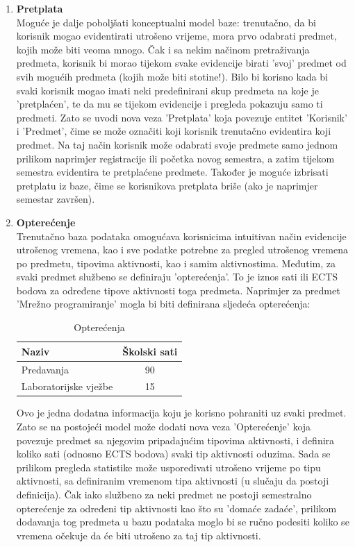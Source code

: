 \documentclass[times, utf8, zavrsni, numeric]{fer}
\begin{document}
\begin{enumerate}[leftmargin=*]
\item \textbf{Pretplata}\\
Moguće je dalje poboljšati konceptualni model baze: trenutačno, da bi korisnik mogao evidentirati utrošeno vrijeme, mora prvo odabrati predmet, kojih može biti veoma mnogo. Čak i sa nekim načinom pretraživanja predmeta, korisnik bi morao tijekom svake evidencije birati 'svoj' predmet od svih mogućih predmeta (kojih može biti stotine!). Bilo bi korisno kada bi svaki korisnik mogao imati neki predefinirani skup predmeta na koje je 'pretplaćen', te da mu se tijekom evidencije i pregleda pokazuju samo ti predmeti. Zato se uvodi nova veza 'Pretplata' koja povezuje entitet 'Korisnik' i 'Predmet', čime se može označiti koji korisnik trenutačno evidentira koji predmet. Na taj način korisnik može odabrati svoje predmete samo jednom prilikom naprimjer registracije ili početka novog semestra, a zatim tijekom semestra evidentira te pretplaćene predmete. Također je moguće izbrisati pretplatu iz baze, čime se korisnikova pretplata briše (ako je naprimjer semestar završen).

\item \textbf{Opterećenje}\\
Trenutačno baza podataka omogućava korisnicima intuitivan način evidencije utrošenog vremena, kao i sve podatke potrebne za pregled utrošenog vremena po predmetu, tipovima aktivnosti, kao i samim aktivnostima. Međutim, za svaki predmet službeno se definiraju 'opterećenja'. To je iznos sati ili ECTS bodova za određene tipove aktivnosti toga predmeta. Naprimjer za predmet 'Mrežno programiranje' mogla bi biti definirana sljedeća opterećenja:

\begin{table}[H]
\caption{Opterećenja}
\label{tbl:opterecenja}
\centering
\begin{tabular}{lc} \hline
Naziv & Školski sati\\ \hline
Predavanja & 90 \\
Laboratorijske vježbe & 15 \\ \hline
\end{tabular}
\end{table}

Ovo je jedna dodatna informacija koju je korisno pohraniti uz svaki predmet. Zato se na postojeći model može dodati nova veza 'Opterećenje' koja povezuje predmet sa njegovim pripadajućim tipovima aktivnosti, i definira koliko sati (odnosno ECTS bodova) svaki tip aktivnosti oduzima. Sada se prilikom pregleda statistike može uspoređivati utrošeno vrijeme po tipu aktivnosti, sa definiranim vremenom tipa aktivnosti (u slučaju da postoji definicija). Čak iako službeno za neki predmet ne postoji semestralno opterećenje za određeni tip aktivnosti kao što su 'domaće zadaće', prilikom dodavanja tog predmeta u bazu podataka moglo bi se ručno podesiti koliko se vremena očekuje da će biti utrošeno za taj tip aktivnosti.
\end{enumerate}
\end{document}
